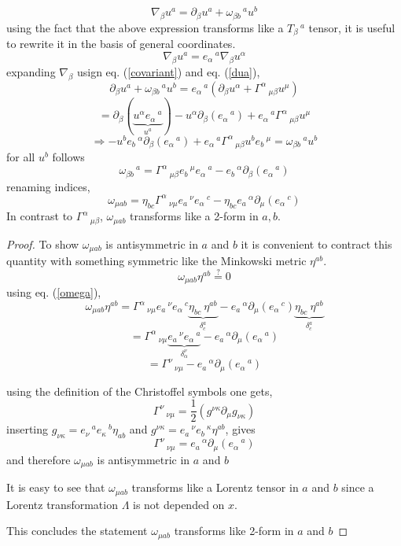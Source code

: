 \documentclass[12pt,a4paper]{article}
\begin{document}
	\begin{equation}
		\label{dua}
		\nabla_\beta u^a = \partial_\beta u^a + \omega_{\beta b}\,^{a}u^b
	\end{equation}
	using the fact that the above expression transforms like a $T_{\beta}\,^{a}$ tensor, it is useful to rewrite it in the basis of general coordinates.  
	$$
	\nabla_\beta u^a = e_\alpha\,^a \nabla_\beta u^\alpha 
	$$
	expanding $\nabla_\beta$ usign eq. (\ref{covariant}) and eq. (\ref{dua}),
	$$
	 \partial_\beta u^a + \omega_{\beta b}\,^{a}u^b = e_\alpha\,^a \left(  \partial_\beta u^\alpha  +   \Gamma^\alpha\,_{\mu \beta} u^\mu \right)
	$$
	$$
	 = \partial_\beta(\underbrace{u^\alpha e_\alpha\,^a}_{u^a}) - u^\alpha \partial_\beta (e_\alpha\,^a) +  e_\alpha\,^a   \Gamma^\alpha\,_{\mu \beta} u^\mu 
	$$
	$$
 \Rightarrow - u^b e_b\,^{\alpha} \partial_\beta (e_\alpha\,^a) +  e_\alpha\,^a   \Gamma^\alpha\,_{\mu \beta} u^b e_b\,^{\mu}  =  \omega_{\beta b}\,^{a}u^b
	$$
	for all $u^b$ follows
	\begin{equation}
		 \omega_{\beta b}\,^{a} = \Gamma^\alpha\,_{\mu \beta} e_b\,^{\mu} e_\alpha\,^a    - e_b\,^{\alpha} \partial_\beta (e_\alpha\,^a) 
	\end{equation}
	renaming indices,
	\begin{equation}
		\label{omega}
		\omega_{\mu a b} = \eta_{b c}\Gamma^\alpha\,_{\nu \mu} e_a\,^{\nu} e_\alpha\,^c    - \eta_{b c} e_a\,^{\alpha} \partial_\mu (e_\alpha\,^c) 
	\end{equation}
	In contrast to $\Gamma^\alpha\,_{\mu \beta}$, $\omega_{\mu a b}$ transforms like a 2-form in $a,b$.
	
	\begin{proof}
		To show $\omega_{\mu a b}$ is antisymmetric in $a$ and $b$ it is convenient to contract this quantity with something symmetric like the Minkowski metric $\eta^{ab}$. 
		$$\omega_{\mu a b}\eta^{ab} \stackrel{?}{=} 0$$
		using eq. (\ref{omega}),
		$$\omega_{\mu a b}\eta^{ab} = \Gamma^\alpha\,_{\nu \mu} e_a\,^{\nu} e_\alpha\,^c \underbrace{\eta_{b c} \ \eta^{ab}}_{\delta_c^a}    -  e_a\,^{\alpha} \partial_\mu (e_\alpha\,^c)  \underbrace{\eta_{b c} \ \eta^{ab}}_{\delta_c^a}     $$
		$$ = \Gamma^\alpha\,_{\nu \mu} \underbrace{e_a\,^{\nu} e_\alpha\,^a}_{\delta_\alpha^\nu} -  e_a\,^{\alpha} \partial_\mu (e_\alpha\,^a)$$
		$$ = \Gamma^\nu\,_{\nu \mu} - e_a\,^{\alpha} \partial_\mu (e_\alpha\,^a)$$
		
		using the definition of the Christoffel symbols one gets,
		$$\Gamma^\nu\,_{\nu \mu} = \frac{1}{2}\left(g^{\nu \kappa}\partial_\mu g_{\nu \kappa}\right)$$
		inserting $ g_{\nu \kappa} = e_{\nu}\,^a e_{\kappa}\,^b \eta_{ab}$ and $ g^{\nu \kappa} = e_{a}\,^\nu e_{b}\,^\kappa \eta^{ab}$, gives $$\Gamma^\nu\,_{\nu \mu} =  e_a\,^{\alpha} \partial_\mu (e_\alpha\,^a)$$
		and therefore $\omega_{\mu a b}$ is antisymmetric in $a$ and $b$
		
		It is easy to see that $\omega_{\mu a b}$ transforms like a Lorentz tensor in $a$ and $b$ since a Lorentz transformation $\Lambda$ is not depended on $x$. 
		
		This concludes the statement $\omega_{\mu a b}$ transforms like 2-form in $a$ and $b$
		
	\end{proof}
	
\end{document}
